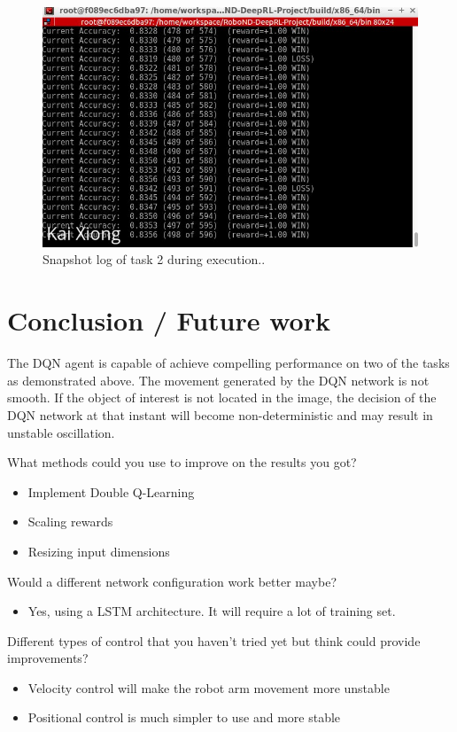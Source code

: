 \documentclass[10pt,journal,compsoc]{IEEEtran}
\begin{document}
\begin{figure}[thpb]
      \centering
      \includegraphics[scale=0.3]{task2_results_format.png}
      \caption{Snapshot log of task 2 during execution..}
      \label{fig:robot3}
\end{figure}

\section{Conclusion / Future work}
The DQN agent is capable of achieve compelling performance on two of the tasks as demonstrated above. The movement generated by the DQN network is not smooth. If the object of interest is not located in the image, the decision of the DQN network at that instant will become non-deterministic and may result in unstable oscillation. 

What methods could you use to improve on the results you got?
\begin{itemize}
      \item Implement Double Q-Learning
      \item Scaling rewards
      \item Resizing input dimensions
\end {itemize}

Would a different network configuration work better maybe? 
\begin{itemize}
      \item Yes, using a LSTM architecture. It will require a lot of training set.
\end {itemize}

Different types of control that you haven't tried yet but think could provide improvements?

\begin{itemize}
      \item Velocity control will make the robot arm movement more unstable
      \item Positional control is much simpler to use and more stable
\end {itemize}
\end{document}
